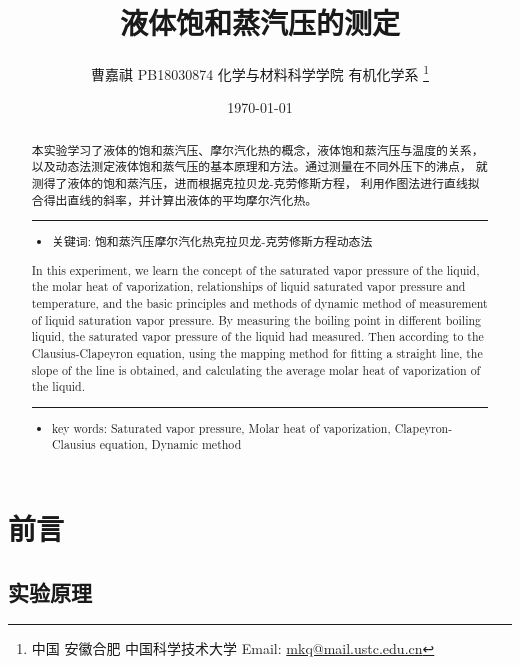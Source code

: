 \documentclass[11pt]{report}
\author{曹嘉祺 PB18030874 化学与材料科学学院 有机化学系 \thanks{中国 安徽合肥 中国科学技术大学 Email: \href{mailto:mkq@mail.ustc.edu.cn}{mkq@mail.ustc.edu.cn}}}
\date{\today}
\title{液体饱和蒸汽压的测定}
\begin{document}
\maketitle
\tableofcontents

\begin{abstract}
本实验学习了液体的饱和蒸汽压、摩尔汽化热的概念，液体饱和蒸汽压与温度的关系，
以及动态法测定液体饱和蒸气压的基本原理和方法。通过测量在不同外压下的沸点，
就测得了液体的饱和蒸汽压，进而根据克拉贝龙-克劳修斯方程，
利用作图法进行直线拟合得出直线的斜率，并计算出液体的平均摩尔汽化热。


\noindent\rule{\textwidth}{0.5pt}
\begin{itemize}
\item 关键词: 饱和蒸汽压\quad 摩尔汽化热\quad 克拉贝龙-克劳修斯方程\quad 动态法
\end{itemize}
\end{abstract}
\begin{abstract}
In this experiment, we learn the concept of the saturated vapor pressure of the liquid,
the molar heat of vaporization, relationships of liquid saturated vapor pressure and temperature,
and the basic principles and methods of dynamic method of measurement of liquid saturation vapor pressure.
By measuring the boiling point in different boiling liquid, the saturated vapor pressure of the liquid had measured.
Then according to the Clausius-Clapeyron equation, using the mapping method for fitting a straight line,
the slope of the line is obtained, and calculating the average molar heat of vaporization of the liquid.

\noindent\rule{\textwidth}{0.5pt}

\begin{itemize}
\item key words:  Saturated vapor pressure, Molar heat of vaporization, Clapeyron-Clausius equation, Dynamic method
\end{itemize}
\end{abstract}
\part{前言}
\label{sec:orgb6570ec}
\chapter{实验原理}
\label{sec:org03f6aee}
\end{document}
